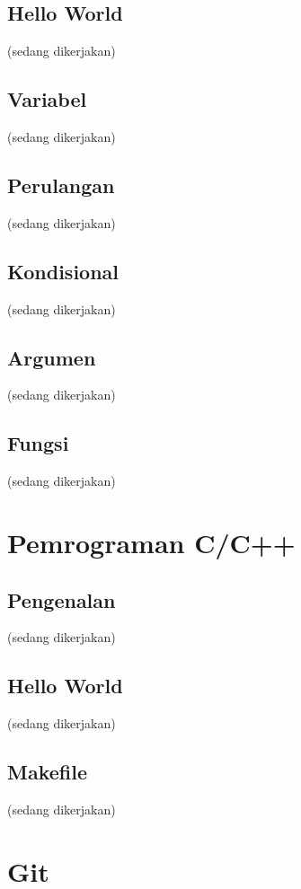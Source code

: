 \documentclass[12pt,]{article}
\begin{document}
	\subsection{Hello World}
	(sedang dikerjakan)
	
	\subsection{Variabel}
	(sedang dikerjakan)
	
	\subsection{Perulangan}
	(sedang dikerjakan)
	
	\subsection{Kondisional}
	(sedang dikerjakan)
	
	\subsection{Argumen}
	(sedang dikerjakan)
	
	\subsection{Fungsi}
	(sedang dikerjakan)
	
	\section{Pemrograman C/C++}
	
	\subsection{Pengenalan}
	(sedang dikerjakan)
	
	\subsection{Hello World}
	(sedang dikerjakan)
	
	\subsection{Makefile}
	(sedang dikerjakan)
	
	\section{Git}
	
\end{document}
